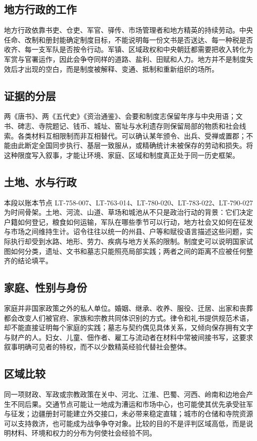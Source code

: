 \subsection{地方行政的工作}
地方行政依靠书吏、仓吏、军官、驿传、市场管理者和地方精英的持续劳动。中央任命、改制和册封能确定制度目标，不能说明每一份文书是否送达、每一种税是否收齐、每一支军队是否按令行动。军镇、区域政权和中央朝廷都需要把收入转化为军赏与官署运作，因此会争夺同样的道路、盐利、田赋和人力。地方并不是制度失效后才出现的空白，而是制度被解释、变通、抵制和重新组织的场所。

\subsection{证据的分层}
两《唐书》、两《五代史》《资治通鉴》、会要和制度志保留年序与中央用语；文书、碑志、寺院题记、钱币、城址、窑址与水利遗存则保留局部的物质和社会线索。各类材料互相限制而非互相替代。可以确认某年颁令、出兵、受禅或置郡；不能由此断定全国同步执行、基层一致服从，或精确统计未被保存的劳动和损失。将这种限度写入叙事，才能让环境、家庭、区域和制度真正处于同一历史框架。
\subsection{土地、水与行政}
本段以账本节点 LT-758-007、LT-763-014、LT-780-020、LT-783-022、LT-790-027 为时间骨架。土地、河流、山道、草场和城池从不只是政治行动的背景：它们决定户籍如何登记，粮食如何运输，军队在哪些季节可以行动，地方社会又如何在征发与市场之间维持生计。诏令往往以统一的州县、户等和赋役语言描述这些问题，实际执行却受到水路、地形、劳力、疾病与地方关系的限制。制度史可以说明国家试图如何分类，遗址、文书和墓志只能照亮局部实践；两者之间的距离不应被任何整齐的结论填平。

\subsection{家庭、性别与身份}
家庭并非国家政策之外的私人单位。婚姻、继承、收养、服役、迁居、出家和丧葬都会改变人们被官府、家族和宗教共同体识别的方式。律令和礼书提供规范术语，却不能直接证明每个家庭的实践；墓志与契约偶见具体关系，又倾向保存拥有文字与财产的人。妇女、儿童、佃作者、雇工与流动者在材料中常被间接书写，这要求叙事明确可见者的特权，而不以少数精英经验代替社会整体。

\subsection{区域比较}
同一项财政、军政或宗教政策在关中、河北、江淮、巴蜀、河西、岭南和边地会产生不同后果。交通节点可能让一地成为漕运和市场中心，也可能使其优先承受驻军与征发；边疆册封可能建立外交接口，未必带来稳定直辖；城市的仓储和寺院资源可以支持救济，也可能成为战争争夺对象。比较的目的不是评判区域高低，而是说明材料、环境和权力的分布为何使社会经验不同。

